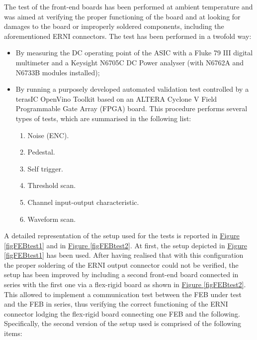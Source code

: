 \par

\par
The test of the front-end boards has been performed at ambient temperature and was aimed at verifying the proper functioning of the board and at looking for damages to the board or improperly soldered components, including the aforementioned ERNI connectors. The test has been performed in a twofold way:

\begin{itemize}
    \itemsep0em 
    \item By measuring the DC operating point of the ASIC with a Fluke 79 III digital multimeter and a Keysight N6705C DC Power analyser (with N6762A and N6733B modules installed);
    \item By running a purposely developed automated validation test controlled by a terasIC OpenVino Toolkit based on an ALTERA Cyclone V Field Programmable Gate Array (FPGA) board. This procedure performs several types of tests, which are summarised in the following list:
    
    \begin{enumerate}
        \itemsep0em 
        \item Noise (ENC).
        \item Pedestal.
        \item Self trigger.
        \item Threshold scan.
        \item Channel input-output characteristic.
        \item Waveform scan.
    \end{enumerate}
\end{itemize}

\par
A detailed representation of the setup used for the tests is reported in \hyperref[figFEBtest1]{Figure \ref{figFEBtest1}} and in \hyperref[figFEBtest2]{Figure \ref{figFEBtest2}}. At first, the setup depicted in \hyperref[figFEBtest1]{Figure \ref{figFEBtest1}} has been used. After having realised that with this configuration the proper soldering of the ERNI output connector could not be verified, the setup has been improved by including a second front-end board connected in series with the first one via a flex-rigid board as shown in \hyperref[figFEBtest2]{Figure \ref{figFEBtest2}}. This allowed to implement a communication test between the FEB under test and the FEB in series, thus verifying the correct functioning of the ERNI connector lodging the flex-rigid board connecting one FEB and the following. Specifically, the second version of the setup used is comprised of the following items:

